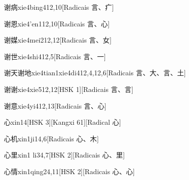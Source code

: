 \begin{entry}{谢病}{xie4bing4}{12,10}[Radicais ⾔、⽧]
\end{entry}

\begin{entry}{谢恩}{xie4'en1}{12,10}[Radicais ⾔、⼼]
\end{entry}

\begin{entry}{谢媒}{xie4mei2}{12,12}[Radicais ⾔、⼥]
\end{entry}

\begin{entry}{谢世}{xie4shi4}{12,5}[Radicais ⾔、⼀]
\end{entry}

\begin{entry}{谢天谢地}{xie4tian1xie4di4}{12,4,12,6}[Radicais ⾔、⼤、⾔、⼟]
\end{entry}

\begin{entry}{谢谢}{xie4xie5}{12,12}[HSK 1][Radicais ⾔、⾔]
\end{entry}

\begin{entry}{谢意}{xie4yi4}{12,13}[Radicais ⾔、⼼]
\end{entry}

\begin{entry}{心}{xin1}{4}[HSK 3][Kangxi 61][Radical ⼼]
\end{entry}

\begin{entry}{心机}{xin1ji1}{4,6}[Radicais ⼼、⽊]
\end{entry}

\begin{entry}{心里}{xin1 li3}{4,7}[HSK 2][Radicais ⼼、⾥]
\end{entry}

\begin{entry}{心情}{xin1qing2}{4,11}[HSK 2][Radicais ⼼、⼼]
\end{entry}

